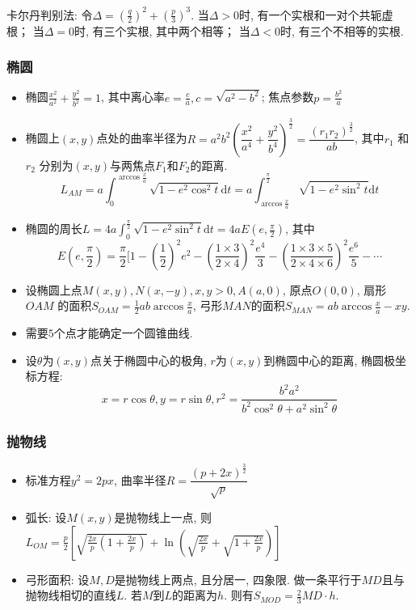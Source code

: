 \documentclass[landscape,a4paper]{article}
\begin{document}
\begin{spacing}{0.3}
\begin{multicols}{2}
卡尔丹判别法:
令$\Delta = (\frac{q}{2}) ^ 2 + (\frac{p}{3}) ^ 3$.
当$\Delta > 0$时, 有一个实根和一对个共轭虚根；
当$\Delta = 0$时, 有三个实根, 其中两个相等；
当$\Delta < 0$时, 有三个不相等的实根.

\subsubsection{椭圆}
\begin{itemize}
\item 椭圆$\frac{x^2}{a^2} + \frac{y^2}{b^2} = 1$, 其中离心率$e = \frac{c}{a}, c = \sqrt{a^2 - b^2}$; 焦点参数$p = \frac{b^2}{a}$
\item 椭圆上$(x, y)$点处的曲率半径为$R = a^2 b^2 (\dfrac{x^2}{a^4} + \dfrac{y^2}{b^4})^\frac{3}{2} = \dfrac{(r_1 r_2)^\frac{3}{2}}{ab}$, 其中$r_1$ 和$r_2$ 分别为$(x, y)$与两焦点$F_1$和$F_2$的距离. %
  \[ L_{AM} = a \int_0^{\arccos{\frac{x}{a} }} \sqrt{1 - e^2 \cos^2 t} \textrm{d} t = a \int_{\arccos{\frac{x}{a} }}^\frac{\pi}{2} \sqrt{1 - e^2 \sin^2 t} \textrm{d} t\]
\item 椭圆的周长$L = 4a \int_0^{\frac{\pi}{2}} \sqrt{1 - e^2 \sin^2 t } \textrm{d} t = 4a E(e, \frac{\pi}{2})$, 其中
  \[ E(e, \frac{\pi}{2}) = \frac{\pi}{2} [ 1 - (\frac{1}{2})^2 e^2 - (\frac{1 \times 3}{2 \times 4})^2 \frac{e^4}{3} - (\frac{1 \times 3 \times 5}{2 \times 4 \times 6})^2 \frac{e^6}{5} - \cdots\]
\item 设椭圆上点$M(x, y), N(x, -y), x, y > 0, A(a, 0)$, 原点$O(0, 0)$, 扇形$OAM$ 的面积$S_{OAM} = \frac{1}{2} ab \arccos{\frac{x}{a}}$, 弓形$MAN$的面积$S_{MAN} = ab \arccos{\frac{x}{a}} - xy$.
\item 需要$5$个点才能确定一个圆锥曲线.
\item 设$\theta$为$(x, y)$点关于椭圆中心的极角, $r$为$(x, y)$到椭圆中心的距离, 椭圆极坐标方程:
  \[ x = r \cos \theta, y = r \sin \theta, r^2 = \frac{b^2 a^2}{b^2 \cos^2 \theta + a^2 \sin^2 \theta}\]
\end{itemize}

\subsubsection{抛物线}
\begin{itemize}
\item 标准方程$y^2 = 2px$, 曲率半径$ R = \dfrac{(p + 2x)^{\frac{3}{2} }}{\sqrt{p}}$
\item 弧长: 设$M(x, y)$是抛物线上一点, 则$L_{OM} = \frac{p}{2} [ \sqrt{\frac{2x}{p}(1 + \frac{2x}{p})} + \ln(\sqrt{\frac{2x}{p}} + \sqrt{1 + \frac{2x}{p}})]$
\item 弓形面积: 设$M, D$是抛物线上两点, 且分居一, 四象限. 做一条平行于$MD$且与抛物线相切的直线$L$. 若$M$到$L$的距离为$h$. 则有$S_{MOD} = \frac{2}{3}MD \cdot h$.
\end{itemize}


\end{multicols}
\end{spacing}
\end{document}
